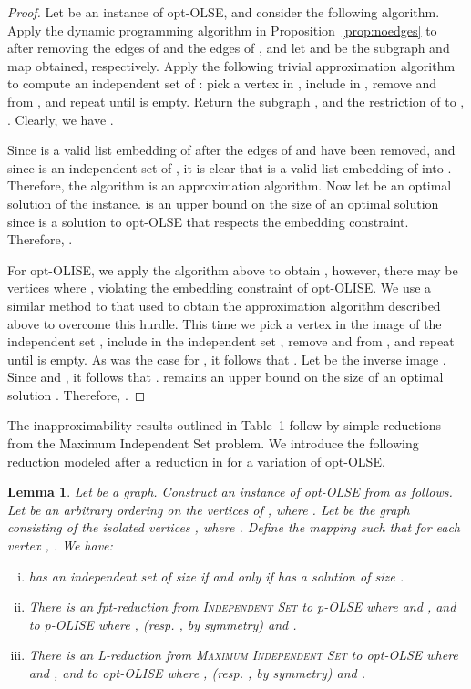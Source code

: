 \documentclass[11pt]{article}
\newtheorem{lemma}[theorem]{Lemma}
\begin{document}
\begin{proof}
Let  be an instance of opt-OLSE, and consider the following algorithm. Apply the dynamic programming algorithm in Proposition~\ref{prop:noedges} to  after removing the edges of  and the edges of , and let  and  be the subgraph and map obtained, respectively. Apply the following trivial approximation algorithm to compute an independent set  of : pick a vertex  in , include  in , remove  and  from , and repeat until  is empty.  Return the subgraph , and the restriction of  to , . Clearly, we have .

Since  is a valid list embedding of  after the edges of  and  have been removed, and since  is an independent set of , it is clear that  is a valid list embedding of  into . Therefore, the algorithm is an approximation algorithm. Now let  be an optimal solution of the instance.  is an upper bound on the size of an optimal solution  since  is a solution to opt-OLSE that respects the embedding constraint. Therefore, .

For opt-OLISE, we apply the algorithm above to obtain , however, there may be vertices  where , violating the embedding constraint of opt-OLISE.  We use a similar method to that used to obtain the approximation algorithm described above to overcome this hurdle. This time we pick a vertex  in the image  of the independent set , include  in the independent set , remove  and  from , and repeat until  is empty. As was the case for , it follows that . Let  be the inverse image . Since  and , it follows that .  remains an upper bound on the size of an optimal solution . Therefore, . \end{proof}

The inapproximability results outlined in Table~1 follow by simple reductions from the {\sc Maximum Independent Set} problem.  We introduce the following reduction modeled after a reduction in \cite{xiuzhen} for a variation of opt-OLSE.

\begin{lemma}
\label{lem:reduce-IS}
Let  be a graph.  Construct an instance  of opt-OLSE from  as follows. Let  be an arbitrary ordering on the vertices of ,  where .  Let  be the graph consisting of the isolated vertices , where .  Define the mapping  such that for each vertex , . We have:
\begin{enumerate}[(i)]
  \item  has an independent set of size  if and only if  has a solution of size .
  \item There is an fpt-reduction from \textsc{Independent Set} to p-OLSE where  and , and to p-OLISE where ,  (resp. ,  by symmetry) and .
  \item There is an L-reduction from \textsc{Maximum Independent Set} to opt-OLSE where  and , and to opt-OLISE where ,  (resp. ,  by symmetry) and .
\end{enumerate}
\end{lemma}
\end{document}
